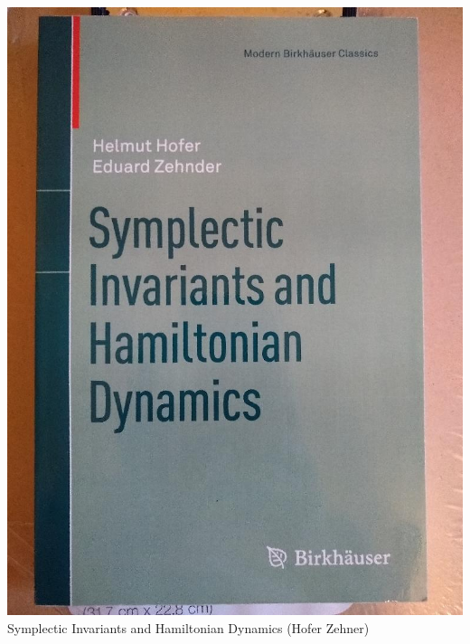 \documentclass[t]{beamer}
\newcommand{\htarget}[2]{\hypertarget{#1}{#2}}
\begin{document}
\begin{frame}\htarget{SHZ}{} \begin{center}
\includegraphics[height=0.8\textheight]{Symplectic_Invariants_and_Hamiltonian_Dynamics_Hofer_Zehner_mini.jpg} \\
Symplectic Invariants and Hamiltonian Dynamics (Hofer Zehner)
\end{center} \end{frame}
\end{document}
